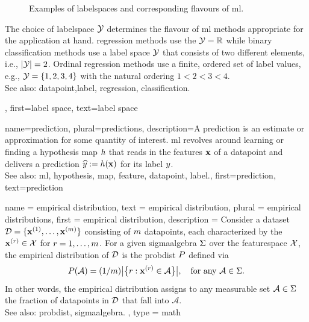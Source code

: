 {{\begin{figure}[H]
\begin{tikzpicture}[>=Stealth, font=\small]
		\end{tikzpicture}
		\caption{\label{fig_label_spaces_dict}	Examples of \glspl{labelspace} and corresponding flavours of 
		\gls{ml}.}
		\end{figure}
		The choice of \gls{labelspace} $\labelspace$ determines the flavour of \gls{ml} methods 
		appropriate for the application at hand. \Gls{regression} methods use the $\labelspace = \mathbb{R}$ while binary \gls{classification} methods 
		use a \gls{label} space $\labelspace$ that consists of two different 
		elements, i.e., $|\labelspace|=2$. Ordinal \gls{regression} methods use a finite, ordered set of 
		\gls{label} values, e.g., $\labelspace = \{1,2,3,4\}$ with the natural ordering $1 < 2 < 3 < 4$. 
					\\ 
		See also:  \gls{datapoint},\gls{label}, \gls{regression}, \gls{classification}.}, 
	first={label space},
	text={label space}  
}

{name={prediction}, plural={predictions},
	description={A prediction is an estimate or approximation for some 
		quantity of interest. \Gls{ml} revolves around learning or finding a \gls{hypothesis} \gls{map} $\hypothesis$ 
		that reads in the \glspl{feature} $\featurevec$ of a \gls{datapoint} and delivers a prediction 
		$\widehat{\truelabel} \defeq \hypothesis(\featurevec)$ for its \gls{label} $\truelabel$.
					\\ 
		See also: \gls{ml}, \gls{hypothesis}, \gls{map}, \gls{feature}, \gls{datapoint}, \gls{label}.},
	first={prediction},
	text={prediction}  
}

{name = {empirical distribution},
 text = {empirical distribution},
plural = {empirical distributions},
first = {empirical distribution},
description = {Consider a \gls{dataset} 
 $\dataset = \{ \featurevec^{(1)},\ldots, \featurevec^{(\samplesize)}\}$ 
  consisting of $\samplesize$ \glspl{datapoint}, each characterized by 
  the $\featurevec^{(\sampleidx)} \in \featurespace$ for $\sampleidx = 1, \ldots, \samplesize$. 
  For a given \gls{sigmaalgebra} $\sigmaalgebra$ over the \gls{featurespace} 
  $\featurespace$, the empirical distribution  
  of $\dataset$ is the \gls{probdist} $\probdist$ defined via 
   $$\probdist(\mathcal{A}) = (1/\samplesize) \big| \big\{ \sampleidx: \featurevec^{(\sampleidx)} \in \mathcal{A} \big\} \big|, 
	\quad \text{for any } \mathcal{A} \in \sigmaalgebra.
	$$
	In other words, the empirical distribution assigns to any \gls{measurable} set 
	$\mathcal{A} \in \sigmaalgebra$ the fraction of \glspl{datapoint} in $\dataset$ 
	that fall into $\mathcal{A}$.
	\\
        See also: \gls{probdist}, \gls{sigmaalgebra}.
    },
    type = {math}
}




